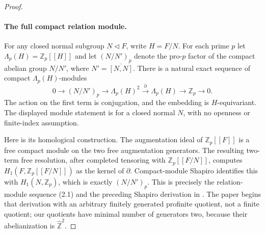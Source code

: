 \begin{proof}
\paragraph{The full compact relation module.}
For any closed normal subgroup $N\triangleleft F$, write $H=F/N$.
For each prime $p$ let $\Lambda_p(H)=\mathbb Z_p[[H]]$ and let
$(N/N')_p$ denote the pro-$p$ factor of the compact abelian group
$N/N'$, where $N'=\overline{[N,N]}$.
There is a natural exact sequence of compact $\Lambda_p(H)$-modules
\[
 0\longrightarrow (N/N')_p
 \longrightarrow \Lambda_p(H)^2
 \xrightarrow{\partial}\Lambda_p(H)
 \longrightarrow\mathbb Z_p\longrightarrow0.          \tag{C.48.3}
\]
The action on the first term is conjugation, and the embedding is
$H$-equivariant. The displayed module statement is for a closed
normal $N$, with no openness or finite-index assumption.

Here is its homological construction. The augmentation ideal of
$\mathbb Z_p[[F]]$ is a free compact module on the two free
augmentation generators. The resulting two-term free resolution,
after completed tensoring with $\mathbb Z_p[[F/N]]$, computes
$H_1(F,\mathbb Z_p[[F/N]])$ as the kernel of $\partial$.
Compact-module Shapiro identifies this with $H_1(N,\mathbb Z_p)$,
which is exactly $(N/N')_p$.
This is precisely the relation-module sequence (2.1) and the
preceding Shapiro derivation in
\cite[\S2.2, displayed (2.1), preprint p.~13]{PBC_GJPPZ2014}.
The paper begins that derivation with an arbitrary finitely generated
profinite quotient, not a finite quotient; our quotients have minimal
number of generators two, because their abelianization is
$\widehat{\mathbb Z}^2$.


\end{proof}
